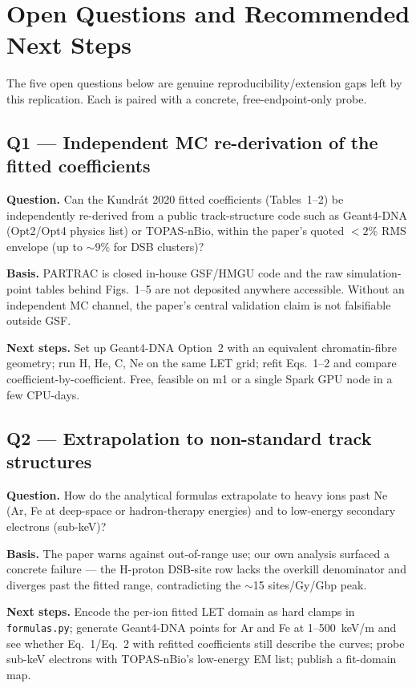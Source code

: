 \section{Open Questions and Recommended Next Steps}

The five open questions below are genuine reproducibility/extension gaps left by this replication. Each is paired with a concrete, free-endpoint-only probe.

\subsection*{Q1 --- Independent MC re-derivation of the fitted coefficients}
\textbf{Question.} Can the Kundr\'at 2020 fitted coefficients (Tables~1--2) be independently re-derived from a public track-structure code such as Geant4-DNA (Opt2/Opt4 physics list) or TOPAS-nBio, within the paper's quoted $<2\%$ RMS envelope (up to $\sim 9\%$ for DSB clusters)?

\textbf{Basis.} PARTRAC is closed in-house GSF/HMGU code and the raw simulation-point tables behind Figs.~1--5 are not deposited anywhere accessible. Without an independent MC channel, the paper's central validation claim is not falsifiable outside GSF.

\textbf{Next steps.} Set up Geant4-DNA Option~2 with an equivalent chromatin-fibre geometry; run H, He, C, Ne on the same LET grid; refit Eqs.~1--2 and compare coefficient-by-coefficient. Free, feasible on m1 or a single Spark GPU node in a few CPU-days.

\subsection*{Q2 --- Extrapolation to non-standard track structures}
\textbf{Question.} How do the analytical formulas extrapolate to heavy ions past Ne (Ar, Fe at deep-space or hadron-therapy energies) and to low-energy secondary electrons (sub-keV)?

\textbf{Basis.} The paper warns against out-of-range use; our own analysis surfaced a concrete failure --- the H-proton DSB-site row lacks the overkill denominator and diverges past the fitted range, contradicting the $\sim$15 sites/Gy/Gbp peak.

\textbf{Next steps.} Encode the per-ion fitted LET domain as hard clamps in \texttt{formulas.py}; generate Geant4-DNA points for Ar and Fe at 1--500~keV/\textmu m and see whether Eq.~1/Eq.~2 with refitted coefficients still describe the curves; probe sub-keV electrons with TOPAS-nBio's low-energy EM list; publish a fit-domain map.

